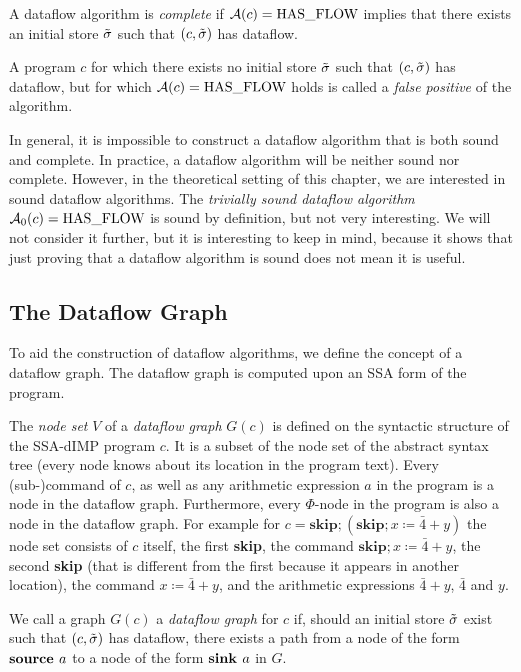 \begin{definition}[Completeness]
    A dataflow algorithm is \emph{complete} if $\operatorname{\mathcal{A}}(c) = \text{HAS\_FLOW}$
    implies that there exists an initial store $\tilde{\sigma}$
     such that $(c, \tilde{\sigma})$ has dataflow.
\end{definition}
\begin{definition}
    A program $c$ for which there exists no initial store $\tilde{\sigma}$ such that 
    $(c, \tilde{\sigma})$ has dataflow, but for which $\operatorname{\mathcal{A}}(c) = \text{HAS\_FLOW}$ holds
    is called a \emph{false positive} of the algorithm.
\end{definition}
\begin{remark}
    In general, it is impossible to construct a dataflow algorithm that is both 
    sound and complete.
    In practice, a dataflow algorithm will be neither sound nor complete.
    However, in the theoretical setting of this chapter, we are interested in 
    sound dataflow algorithms.
    The \emph{trivially sound dataflow algorithm} $\operatorname{\mathcal{A}}_0(c) = \text{HAS\_FLOW}$ 
    is sound by definition, but not very interesting.
    We will not consider it further, but it is interesting to keep in mind,
    because it shows that just proving that a dataflow algorithm is sound does not
    mean it is useful.    
\end{remark}

\subsection{The Dataflow Graph}
To aid the construction of dataflow algorithms, we define the concept
of a dataflow graph.
The dataflow graph is computed upon an SSA form of the program.

\begin{definition}
    The \emph{node set} $V$ of a \emph{dataflow graph} $G(c)$
    is defined on the syntactic structure
    of the SSA-dIMP program $c$. It is a subset of the node set of the abstract syntax tree
    (every node knows about its location in the program text).
    Every (sub-)command of $c$, as well as any arithmetic expression $a$ in the 
    program is a node in the dataflow graph.
    Furthermore, every $\Phi$-node in the program is also a node in the dataflow
    graph.
    For example for
    $c = \textbf{skip}; (\textbf{skip}; x \coloneqq \bar{4} + y)$
    the node set consists of $c$ itself, the first \textbf{skip}, the command 
    $\textbf{skip}; x \coloneqq \bar{4} + y$, the second \textbf{skip} (that is different 
    from the first because it appears in another location), the command
    $x \coloneqq \bar{4} + y$, and the arithmetic expressions $\bar{4}+y$,
    $\bar{4}$ and $y$.

    We call a graph $G(c)$ a \emph{dataflow graph} for $c$ if, should an initial store
    $\tilde{\sigma}{}$ exist such that $(c, \tilde{\sigma}{})$ has dataflow,
    there exists a path from a node of the form $\textbf{source }{a}$ to a node of 
    the form $\textbf{sink }{a}$ in $G$.
\end{definition}

